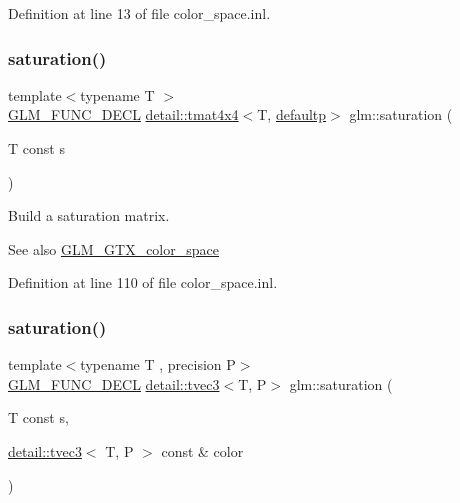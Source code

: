Definition at line 13 of file color\+\_\+space.\+inl.

\mbox{\label{group__gtx__color__space_ga444bcc8582eaa894acf405762ba2a5ff}} 
\subsubsection{\texorpdfstring{saturation()}{saturation()}\hspace{0.1cm}{\footnotesize\ttfamily [1/3]}}
{\footnotesize\ttfamily template$<$typename T $>$ \\
\hyperlink{setup_8hpp_ab2d052de21a70539923e9bcbf6e83a51}{G\+L\+M\+\_\+\+F\+U\+N\+C\+\_\+\+D\+E\+CL} \hyperlink{structglm_1_1detail_1_1tmat4x4}{detail\+::tmat4x4}$<$T, \hyperlink{namespaceglm_a0f04f086094c747d227af4425893f545a9d21ccd8b5a009ec7eb7677befc3bf51}{defaultp}$>$ glm\+::saturation (\begin{DoxyParamCaption}\item[{T const}]{s }\end{DoxyParamCaption})}

Build a saturation matrix. \begin{DoxySeeAlso}{See also}
\hyperlink{group__gtx__color__space}{G\+L\+M\+\_\+\+G\+T\+X\+\_\+color\+\_\+space} 
\end{DoxySeeAlso}


Definition at line 110 of file color\+\_\+space.\+inl.

\mbox{\label{group__gtx__color__space_ga1a6fe89b5effcc718b5f49de5bb50fad}} 
\subsubsection{\texorpdfstring{saturation()}{saturation()}\hspace{0.1cm}{\footnotesize\ttfamily [2/3]}}
{\footnotesize\ttfamily template$<$typename T , precision P$>$ \\
\hyperlink{setup_8hpp_ab2d052de21a70539923e9bcbf6e83a51}{G\+L\+M\+\_\+\+F\+U\+N\+C\+\_\+\+D\+E\+CL} \hyperlink{structglm_1_1detail_1_1tvec3}{detail\+::tvec3}$<$T, P$>$ glm\+::saturation (\begin{DoxyParamCaption}\item[{T const}]{s,  }\item[{\hyperlink{structglm_1_1detail_1_1tvec3}{detail\+::tvec3}$<$ T, P $>$ const \&}]{color }\end{DoxyParamCaption})}

